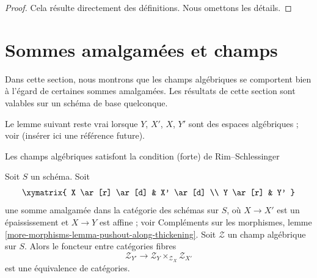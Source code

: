 \begin{proof}
Cela résulte directement des définitions. Nous omettons les détails.
\end{proof}






\section{Sommes amalgamées et champs}
\label{section-pushouts}

\noindent
Dans cette section, nous montrons que les champs algébriques se comportent bien
à l'égard de certaines sommes amalgamées. Les résultats de cette section sont valables sur
un schéma de base quelconque.

\medskip\noindent
Le lemme suivant reste vrai lorsque $Y$, $X'$, $X$, $Y'$ sont
des espaces algébriques ; voir (insérer ici une référence future).

\begin{lemma}
\label{lemma-pushout}
\begin{slogan}
Les champs algébriques satisfont la condition (forte) de Rim--Schlessinger
\end{slogan}
Soit $S$ un schéma. Soit
$$
\xymatrix{
X \ar[r] \ar[d] & X' \ar[d] \\
Y \ar[r] & Y'
}
$$
une somme amalgamée dans la catégorie des schémas sur $S$, où $X \to X'$
est un épaississement et $X \to Y$ est affine ; voir
Compléments sur les morphismes, lemme \ref{more-morphisms-lemma-pushout-along-thickening}.
Soit $\mathcal{Z}$ un champ algébrique sur $S$.
Alors le foncteur entre catégories fibres
$$
\mathcal{Z}_{Y'}
\longrightarrow
\mathcal{Z}_Y \times_{\mathcal{Z}_X} \mathcal{Z}_{X'}
$$
est une équivalence de catégories.
\end{lemma}

